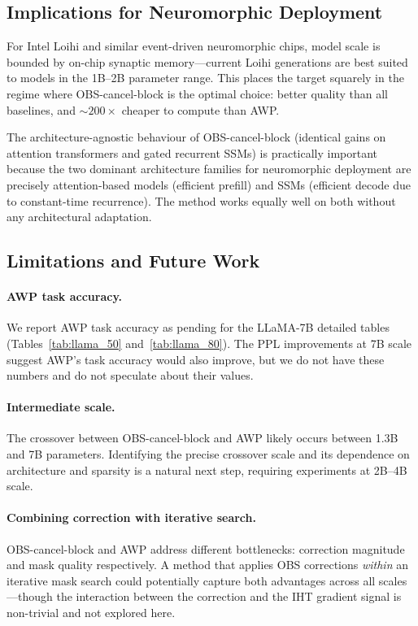 \documentclass{article}
\begin{document}
\subsection{Implications for Neuromorphic Deployment}

For Intel Loihi and similar event-driven neuromorphic chips, model scale is
bounded by on-chip synaptic memory---current Loihi generations are best suited
to models in the 1B--2B parameter range. This places the target squarely in
the regime where OBS-cancel-block is the optimal choice: better quality than
all baselines, and ${\sim}200\times$ cheaper to compute than AWP.

The architecture-agnostic behaviour of OBS-cancel-block (identical gains on
attention transformers and gated recurrent SSMs) is practically important
because the two dominant architecture families for neuromorphic deployment are
precisely attention-based models (efficient prefill) and SSMs (efficient decode
due to constant-time recurrence). The method works equally well on both without
any architectural adaptation.

\subsection{Limitations and Future Work}

\paragraph{AWP task accuracy.}
We report AWP task accuracy as pending for the LLaMA-7B detailed tables
(Tables~\ref{tab:llama_50} and~\ref{tab:llama_80}). The PPL improvements at
7B scale suggest AWP's task accuracy would also improve, but we do not have
these numbers and do not speculate about their values.

\paragraph{Intermediate scale.}
The crossover between OBS-cancel-block and AWP likely occurs between 1.3B and
7B parameters. Identifying the precise crossover scale and its dependence on
architecture and sparsity is a natural next step, requiring experiments at
2B--4B scale.

\paragraph{Combining correction with iterative search.}
OBS-cancel-block and AWP address different bottlenecks: correction magnitude
and mask quality respectively. A method that applies OBS corrections \emph{within}
an iterative mask search could potentially capture both advantages across all
scales---though the interaction between the correction and the IHT gradient
signal is non-trivial and not explored here.
\end{document}
